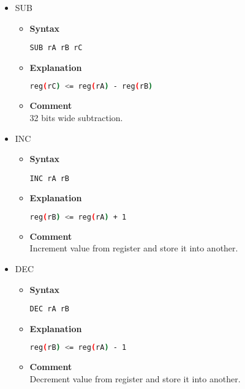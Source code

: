 \begin{itemize}
    \item SUB
    \begin{itemize}
        \item \textbf{Syntax}
        \begin{lstlisting}[language={[markII]Assembler}, frame=single]
    SUB rA rB rC
        \end{lstlisting}
        \item \textbf{Explanation}
        \begin{lstlisting}[language=bash, frame=single]
    reg(rC) <= reg(rA) - reg(rB)
        \end{lstlisting}
        \item \textbf{Comment} \\
    32 bits wide subtraction.
    \end{itemize}

    \item INC
    \begin{itemize}
        \item \textbf{Syntax}
        \begin{lstlisting}[language={[markII]Assembler}, frame=single]
    INC rA rB
        \end{lstlisting}
        \item \textbf{Explanation}
        \begin{lstlisting}[language=bash, frame=single]
    reg(rB) <= reg(rA) + 1
        \end{lstlisting}
        \item \textbf{Comment} \\
    Increment value from register and store it into another.
    \end{itemize}

    \item DEC
    \begin{itemize}
        \item \textbf{Syntax}
        \begin{lstlisting}[language={[markII]Assembler}, frame=single]
    DEC rA rB
        \end{lstlisting}
        \item \textbf{Explanation}
        \begin{lstlisting}[language=bash, frame=single]
    reg(rB) <= reg(rA) - 1
        \end{lstlisting}
        \item \textbf{Comment} \\
    Decrement value from register and store it into another.
    \end{itemize}


\end{itemize}
